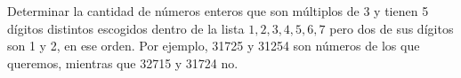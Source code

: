 Determinar la cantidad de números enteros que son múltiplos de 3 y tienen 5 dígitos distintos escogidos dentro de la lista $1, 2, 3, 4, 5, 6, 7$ pero dos de sus dígitos son 1 y 2, en ese orden. Por ejemplo, 31725 y 31254 son números de los que queremos, mientras que 32715 y 31724 no.